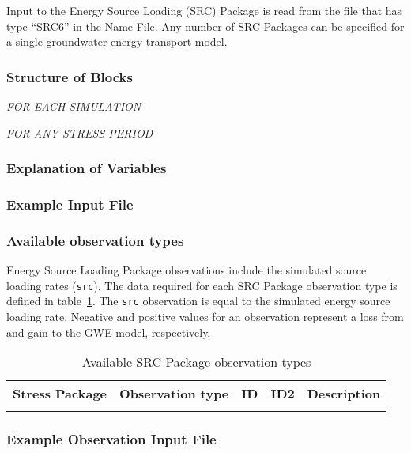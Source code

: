 Input to the Energy Source Loading (SRC) Package is read from the file that has type ``SRC6'' in the Name File.  Any number of SRC Packages can be specified for a single groundwater energy transport model.

\vspace{5mm}
\subsubsection{Structure of Blocks}
\vspace{5mm}

\noindent \textit{FOR EACH SIMULATION}


\vspace{5mm}
\noindent \textit{FOR ANY STRESS PERIOD}

\packageperioddescription

\vspace{5mm}
\subsubsection{Explanation of Variables}
\begin{description}

\end{description}

\vspace{5mm}
\subsubsection{Example Input File}


\vspace{5mm}
\subsubsection{Available observation types}
Energy Source Loading Package observations include the simulated source loading rates (\texttt{src}). The data required for each SRC Package observation type is defined in table~\ref{table:gwe-srcobstype}. The \texttt{src} observation is equal to the simulated energy source loading rate. Negative and positive values for an observation represent a loss from and gain to the GWE model, respectively.

\begin{longtable}{p{2cm} p{2.75cm} p{2cm} p{1.25cm} p{7cm}}
\caption{Available SRC Package observation types} \tabularnewline

\hline
\hline
\textbf{Stress Package} & \textbf{Observation type} & \textbf{ID} & \textbf{ID2} & \textbf{Description} \\
\hline
\endhead

\hline
\endfoot


\label{table:gwe-srcobstype}
\end{longtable}

\vspace{5mm}
\subsubsection{Example Observation Input File}

